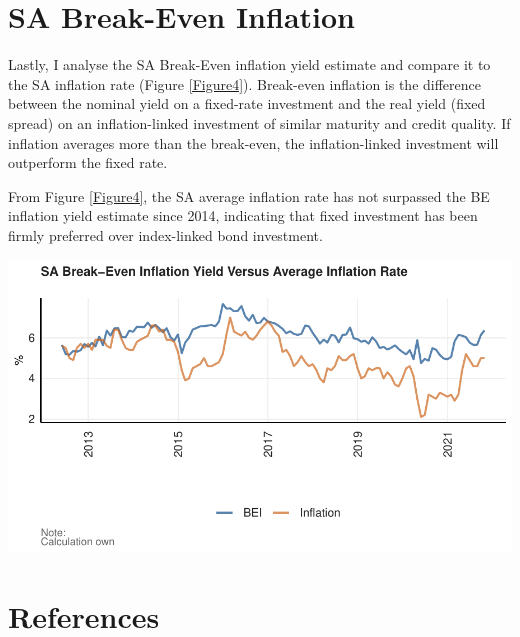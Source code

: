 \documentclass[11pt,preprint, authoryear]{elsarticle}
\let\origfigure\figure
\let\endorigfigure\endfigure
\renewenvironment{figure}[1][2] {
    \expandafter\origfigure\expandafter[H]
} {
    \endorigfigure
}
\numberwithin{equation}{section}
\numberwithin{figure}{section}
\numberwithin{table}{section}
\newlength{\cslhangindent}
\newenvironment{CSLReferences}%
  {\setlength{\parindent}{0pt}%
  \everypar{\setlength{\hangindent}{\cslhangindent}}\ignorespaces}%
  {\par}
\begin{document}
\hypertarget{sa-break-even-inflation}{%
\section{SA Break-Even Inflation}\label{sa-break-even-inflation}}

Lastly, I analyse the SA Break-Even inflation yield estimate and compare
it to the SA inflation rate (Figure \ref{Figure4}). Break-even inflation
is the difference between the nominal yield on a fixed-rate investment
and the real yield (fixed spread) on an inflation-linked investment of
similar maturity and credit quality. If inflation averages more than the
break-even, the inflation-linked investment will outperform the fixed
rate.

From Figure \ref{Figure4}, the SA average inflation rate has not
surpassed the BE inflation yield estimate since 2014, indicating that
fixed investment has been firmly preferred over index-linked bond
investment.

\begin{figure}[H]

{\centering \includegraphics{Question2_files/figure-latex/BEI_infl_plot-1} 

}

\caption{SA Break-Even Inflation Yield Versus Average Inflation Rate \label{Figure4}}\label{fig:BEI_infl_plot}
\end{figure}

\newpage

\hypertarget{references}{%
\section*{References}\label{references}}

\hypertarget{refs}{}
\begin{CSLReferences}{0}{0}
\end{CSLReferences}


\end{document}
